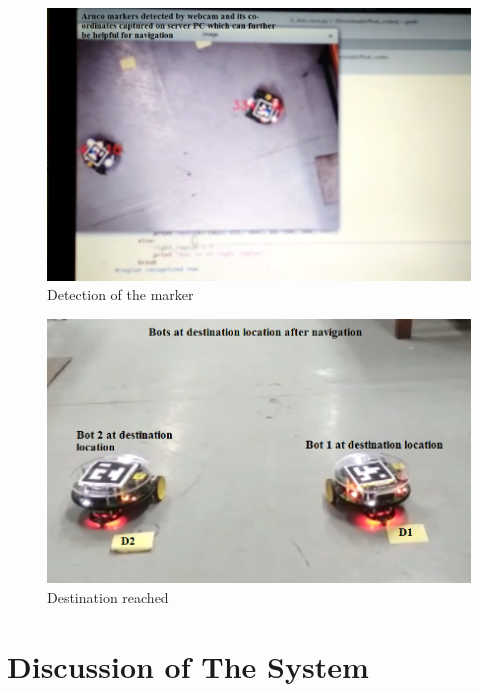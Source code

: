 \documentclass[]{exam}
\begin{document}
  
   \begin{figure}[h!]
 \centering 
  \includegraphics[scale=0.38]{detected.png}
  \caption{Detection of the marker  }
  \label{detected}
  \end{figure}
  
  
  \begin{figure}[h!]
 \centering 
  \includegraphics[scale=0.5]{dest.png}
  \caption{Destination reached }
  \label{dest}
  \end{figure}
  


\section{\color{red} Discussion of The System  }
\end{document}
